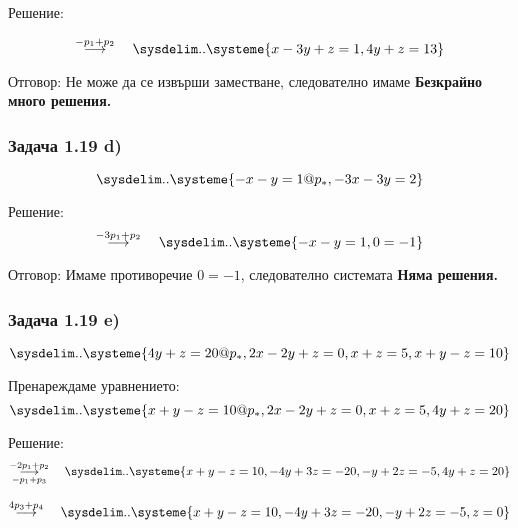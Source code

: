 \documentclass{subfiles}
\begin{document}
\noindent Решение:

\begin{equation*}
    \overset{-p_{1} + p_{2}}{\longrightarrow}
    \quad
    \sysdelim..\systeme{
        x - 3y + z = 1,
        4y + z = 13
    }
\end{equation*}

\noindent Отговор: Не може да се извърши заместване, следователно имаме \textbf{Безкрайно много решения.}

\subsubsection{Задача 1.19 d)}

\begin{equation*}
    \sysdelim..\systeme{
        -x - y = 1@p_{*},
        -3x - 3y = 2
    }
\end{equation*}

\noindent Решение:
\begin{equation*}
    \overset{-3p_{1} + p_{2}}{\longrightarrow}
    \quad
    \sysdelim..\systeme{
        -x - y = 1,
        0 = -1
    }
\end{equation*}

\noindent Отговор: Имаме противоречие $0=-1$, следователно системата \textbf{Няма решения.}

\subsubsection{Задача 1.19 e)}

\begin{equation*}
    \sysdelim..\systeme{
        4y + z = 20@p_{*},
        2x - 2y + z = 0,
        x + z = 5,
        x + y - z = 10
    }
\end{equation*}

\noindent Пренареждаме уравнението:
\begin{equation*}
    \sysdelim..\systeme{
        x + y - z = 10@p_{*},
        2x - 2y + z = 0,
        x + z = 5,
        4y + z = 20
    }
\end{equation*}

\noindent Решение:
\begin{equation*}
    \overset{-2p_{1} + p_{2}}{\underset{-p_{1} + p_{3}}{\longrightarrow}}
    \quad
    \sysdelim..\systeme{
        x + y - z = 10,
        -4y + 3z = -20,
        -y + 2z = -5,
        4y + z = 20
    }
\end{equation*}

\begin{equation*}
    \overset{4p_{3} + p_{4}}{\longrightarrow}
    \quad
    \sysdelim..\systeme{
        x + y - z = 10,
        -4y + 3z = -20,
        -y + 2z = -5,
        z = 0
    }
\end{equation*}
\end{document}
